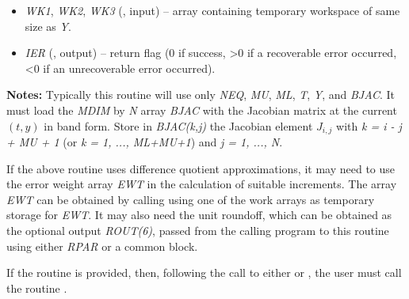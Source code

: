 \documentclass[letterpaper,10pt,english]{sphinxmanual}
\begin{document}
\begin{fulllineitems}
\begin{description}
\begin{itemize}
\item {} 
\emph{WK1}, \emph{WK2}, \emph{WK3}  (, input) -- array containing temporary workspace
of same size as \emph{Y}.

\item {} 
\emph{IER} (, output) -- return flag (0 if success, \textgreater{}0 if a recoverable error
occurred, \textless{}0 if an unrecoverable error occurred).

\end{itemize}

\end{description}

\textbf{Notes:}
Typically this routine will use only \emph{NEQ}, \emph{MU}, \emph{ML}, \emph{T}, \emph{Y}, and
\emph{BJAC}. It must load the \emph{MDIM} by \emph{N} array \emph{BJAC} with the Jacobian
matrix at the current $(t,y)$ in band form.  Store in
\emph{BJAC(k,j)} the Jacobian element $J_{i,j}$ with
\emph{k = i - j + MU + 1} (or \emph{k = 1, ..., ML+MU+1}) and \emph{j = 1, ..., N}.

\end{fulllineitems}


If the above routine uses difference quotient approximations, it may
need to use the error weight array \emph{EWT} in the calculation of
suitable increments. The array \emph{EWT} can be obtained by calling
{\hyperref[f_interface/Optional_output:f/_/FARKGETERRWEIGHTS]{}} using one of the work
arrays as temporary storage for \emph{EWT}. It may also need the unit
roundoff, which can be obtained as the optional output \emph{ROUT(6)},
passed from the calling program to this routine using either \emph{RPAR}
or a common block.

If the {\hyperref[f_interface/Usage:f/_/FARKBJAC]{}} routine is provided, then, following the
call to either {\hyperref[f_interface/Usage:f/_/FARKBAND]{}} or {\hyperref[f_interface/Usage:f/_/FARKLAPACKBAND]{}}, the
user must call the routine {\hyperref[f_interface/Usage:f/_/FARKBANDSETJAC]{}}.
\end{document}

